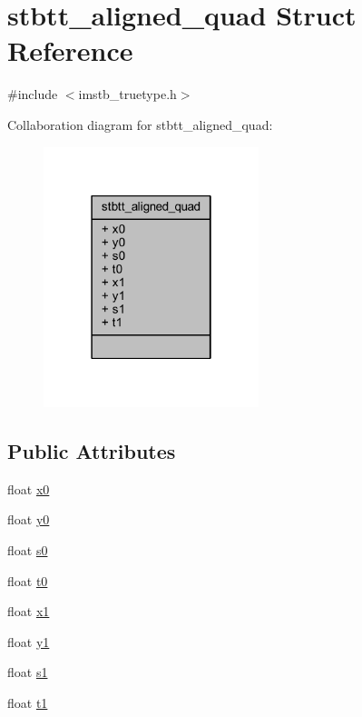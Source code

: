\hypertarget{structstbtt__aligned__quad}{}\section{stbtt\+\_\+aligned\+\_\+quad Struct Reference}
\label{structstbtt__aligned__quad}


{\ttfamily \#include $<$imstb\+\_\+truetype.\+h$>$}



Collaboration diagram for stbtt\+\_\+aligned\+\_\+quad\+:
\nopagebreak
\begin{figure}[H]
\begin{center}
\leavevmode
\includegraphics[width=178pt]{structstbtt__aligned__quad__coll__graph}
\end{center}
\end{figure}
\subsection*{Public Attributes}
\begin{DoxyCompactItemize}
\item 
float \mbox{\hyperlink{structstbtt__aligned__quad_ad74fd8fd69f8a8e1bd20cb0ab7df6e2e}{x0}}
\item 
float \mbox{\hyperlink{structstbtt__aligned__quad_a6178a6b380cf6889893afaeb5019ecd6}{y0}}
\item 
float \mbox{\hyperlink{structstbtt__aligned__quad_ac23b153ff4042deb5499e5a8cacf4a59}{s0}}
\item 
float \mbox{\hyperlink{structstbtt__aligned__quad_a921cd13638a8b3a1e0729021d371da49}{t0}}
\item 
float \mbox{\hyperlink{structstbtt__aligned__quad_a43a7eeac24238e289f825e644331dee6}{x1}}
\item 
float \mbox{\hyperlink{structstbtt__aligned__quad_a66ee8061da982804073a3d2a9114e53c}{y1}}
\item 
float \mbox{\hyperlink{structstbtt__aligned__quad_a26360efee3cdfb5aa2bdc593157b436b}{s1}}
\item 
float \mbox{\hyperlink{structstbtt__aligned__quad_ae1f5ed7333ca5bba46c6a098a05ac75b}{t1}}
\end{DoxyCompactItemize}


